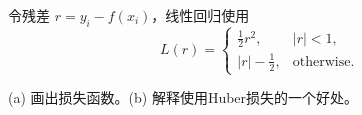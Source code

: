 令残差 \(r=y_i-f(x_i)\)，线性回归使用
\[
L(r)=\begin{cases}\frac12r^2,&|r|<1,\\|r|-\frac12,&\text{otherwise}.\end{cases}
\]


(a) 画出损失函数。(b) 解释使用Huber损失的一个好处。
